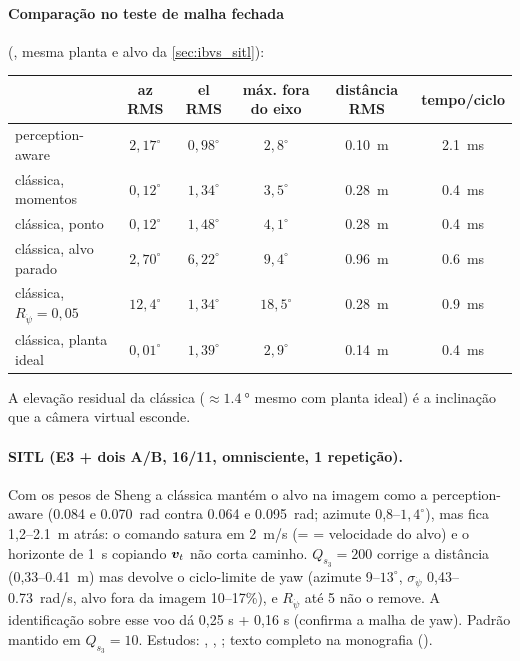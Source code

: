 \paragraph{Comparação no teste de malha fechada} (,
mesma planta e alvo da \autoref{sec:ibvs_sitl}):
\begin{center}
\begin{tabular}{lccccc}
  \toprule
  & az RMS & el RMS & máx. fora do eixo & distância RMS & tempo/ciclo \\
  \midrule
  perception-aware & $2{,}17^\circ$ & $0{,}98^\circ$ & $2{,}8^\circ$ & \SI{0,10}{m} & \SI{2,1}{ms} \\
  clássica, momentos & $0{,}12^\circ$ & $1{,}34^\circ$ & $3{,}5^\circ$ & \SI{0,28}{m} & \SI{0,4}{ms} \\
  clássica, ponto & $0{,}12^\circ$ & $1{,}48^\circ$ & $4{,}1^\circ$ & \SI{0,28}{m} & \SI{0,4}{ms} \\
  clássica, alvo parado & $2{,}70^\circ$ & $6{,}22^\circ$ & $9{,}4^\circ$ & \SI{0,96}{m} & \SI{0,6}{ms} \\
  clássica, $R_{\dot\psi}=0{,}05$ & $12{,}4^\circ$ & $1{,}34^\circ$ & $18{,}5^\circ$ & \SI{0,28}{m} & \SI{0,9}{ms} \\
  clássica, planta ideal & $0{,}01^\circ$ & $1{,}39^\circ$ & $2{,}9^\circ$ & \SI{0,14}{m} & \SI{0,4}{ms} \\
  \bottomrule
\end{tabular}
\end{center}
A elevação residual da clássica ($\approx\SI{1,4}{\degree}$ mesmo com planta ideal) é a inclinação
que a câmera virtual esconde.

\paragraph{SITL (E3 + dois A/B, 16/11, omnisciente, 1 repetição).} Com os pesos de Sheng a clássica
mantém o alvo na imagem como a perception-aware (\SI{0,084}{} e \SI{0,070}{rad} contra \SI{0,064}{} e
\SI{0,095}{rad}; azimute 0,8--$1{,}4^\circ$), mas fica 1,2--\SI{2,1}{m} atrás: o comando satura em
\SI{2}{m/s} (=  = velocidade do alvo) e o horizonte de \SI{1}{s} copiando $\bm{v}_t$ não
corta caminho. $Q_{s_3}=200$ corrige a distância (0,33--\SI{0,41}{m}) mas devolve o ciclo-limite de
yaw (azimute 9--$13^\circ$, $\sigma_{\dot\psi}$ 0,43--\SI{0,73}{rad/s}, alvo fora da imagem 10--17\%), e
$R_{\dot\psi}$ até 5 não o remove. A identificação sobre esse voo dá 0,25 s + 0,16 s (confirma a malha
de yaw). Padrão mantido em $Q_{s_3}=10$. Estudos: ,
, ; texto completo na monografia
().


